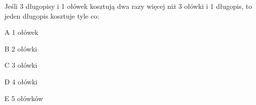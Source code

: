 \begin{tresc}
Jeśli 3 długopisy i 1 ołówek kosztują dwa razy więcej niż 3 ołówki i 1 długopis, to jeden długopis kosztuje tyle co:
\end{tresc}
\begin{wariant}{A} 1 ołówek \end{wariant}
\begin{wariant}{B} 2 ołówki \end{wariant}
\begin{wariant}{C} 3 ołówki \end{wariant}
\begin{wariant}{D} 4 ołówki \end{wariant}
\begin{wariant}{E} 5 ołówków \end{wariant}
